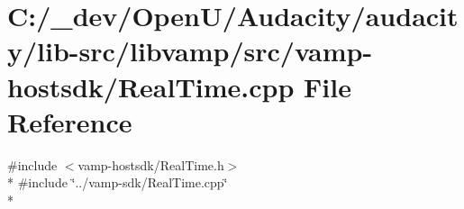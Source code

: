 \hypertarget{vamp-hostsdk_2_real_time_8cpp}{}\section{C\+:/\+\_\+dev/\+Open\+U/\+Audacity/audacity/lib-\/src/libvamp/src/vamp-\/hostsdk/\+Real\+Time.cpp File Reference}
\label{vamp-hostsdk_2_real_time_8cpp}
{\ttfamily \#include $<$vamp-\/hostsdk/\+Real\+Time.\+h$>$}\\*
{\ttfamily \#include \char`\"{}../vamp-\/sdk/\+Real\+Time.\+cpp\char`\"{}}\\*
